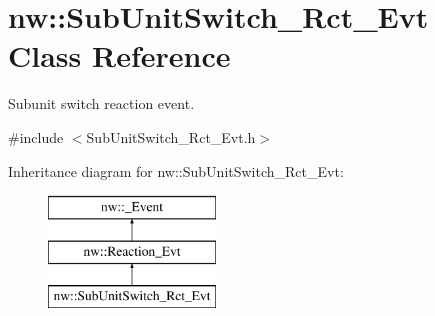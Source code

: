 \hypertarget{classnw_1_1_sub_unit_switch___rct___evt}{\section{nw\+:\+:Sub\+Unit\+Switch\+\_\+\+Rct\+\_\+\+Evt Class Reference}
\label{classnw_1_1_sub_unit_switch___rct___evt}
}


Subunit switch reaction event.  




{\ttfamily \#include $<$Sub\+Unit\+Switch\+\_\+\+Rct\+\_\+\+Evt.\+h$>$}

Inheritance diagram for nw\+:\+:Sub\+Unit\+Switch\+\_\+\+Rct\+\_\+\+Evt\+:\begin{figure}[H]
\begin{center}
\leavevmode
\includegraphics[height=3.000000cm]{d1/d63/classnw_1_1_sub_unit_switch___rct___evt}
\end{center}
\end{figure}
